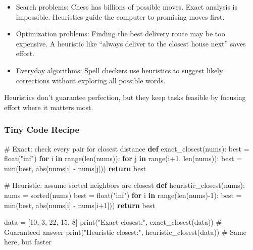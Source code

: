 \documentclass[
  letterpaper,
  DIV=11,
  numbers=noendperiod]{scrreprt}
\newenvironment{Shaded}{\begin{snugshade}}{\end{snugshade}}
\newcommand{\BuiltInTok}[1]{\textcolor[rgb]{0.00,0.23,0.31}{#1}}
\newcommand{\CommentTok}[1]{\textcolor[rgb]{0.37,0.37,0.37}{#1}}
\newcommand{\ControlFlowTok}[1]{\textcolor[rgb]{0.00,0.23,0.31}{\textbf{#1}}}
\newcommand{\DecValTok}[1]{\textcolor[rgb]{0.68,0.00,0.00}{#1}}
\newcommand{\KeywordTok}[1]{\textcolor[rgb]{0.00,0.23,0.31}{\textbf{#1}}}
\newcommand{\NormalTok}[1]{\textcolor[rgb]{0.00,0.23,0.31}{#1}}
\newcommand{\OperatorTok}[1]{\textcolor[rgb]{0.37,0.37,0.37}{#1}}
\newcommand{\StringTok}[1]{\textcolor[rgb]{0.13,0.47,0.30}{#1}}
\providecommand{\tightlist}{%
  \setlength{\itemsep}{0pt}\setlength{\parskip}{0pt}}
\begin{document}
\begin{itemize}
\tightlist
\item
  Search problems: Chess has billions of possible moves. Exact analysis
  is impossible. Heuristics guide the computer to promising moves first.
\item
  Optimization problems: Finding the best delivery route may be too
  expensive. A heuristic like ``always deliver to the closest house
  next'' saves effort.
\item
  Everyday algorithms: Spell checkers use heuristics to suggest likely
  corrections without exploring all possible words.
\end{itemize}

Heuristics don't guarantee perfection, but they keep tasks feasible by
focusing effort where it matters most.

\subsubsection{Tiny Code Recipe}\label{tiny-code-recipe-81}

\begin{Shaded}
\begin{Highlighting}[]
\CommentTok{\# Exact: check every pair for closest distance}
\KeywordTok{def}\NormalTok{ exact\_closest(nums):}
\NormalTok{    best }\OperatorTok{=} \BuiltInTok{float}\NormalTok{(}\StringTok{"inf"}\NormalTok{)}
    \ControlFlowTok{for}\NormalTok{ i }\KeywordTok{in} \BuiltInTok{range}\NormalTok{(}\BuiltInTok{len}\NormalTok{(nums)):}
        \ControlFlowTok{for}\NormalTok{ j }\KeywordTok{in} \BuiltInTok{range}\NormalTok{(i}\OperatorTok{+}\DecValTok{1}\NormalTok{, }\BuiltInTok{len}\NormalTok{(nums)):}
\NormalTok{            best }\OperatorTok{=} \BuiltInTok{min}\NormalTok{(best, }\BuiltInTok{abs}\NormalTok{(nums[i] }\OperatorTok{{-}}\NormalTok{ nums[j]))}
    \ControlFlowTok{return}\NormalTok{ best}

\CommentTok{\# Heuristic: assume sorted neighbors are closest}
\KeywordTok{def}\NormalTok{ heuristic\_closest(nums):}
\NormalTok{    nums }\OperatorTok{=} \BuiltInTok{sorted}\NormalTok{(nums)}
\NormalTok{    best }\OperatorTok{=} \BuiltInTok{float}\NormalTok{(}\StringTok{"inf"}\NormalTok{)}
    \ControlFlowTok{for}\NormalTok{ i }\KeywordTok{in} \BuiltInTok{range}\NormalTok{(}\BuiltInTok{len}\NormalTok{(nums)}\OperatorTok{{-}}\DecValTok{1}\NormalTok{):}
\NormalTok{        best }\OperatorTok{=} \BuiltInTok{min}\NormalTok{(best, }\BuiltInTok{abs}\NormalTok{(nums[i] }\OperatorTok{{-}}\NormalTok{ nums[i}\OperatorTok{+}\DecValTok{1}\NormalTok{]))}
    \ControlFlowTok{return}\NormalTok{ best}

\NormalTok{data }\OperatorTok{=}\NormalTok{ [}\DecValTok{10}\NormalTok{, }\DecValTok{3}\NormalTok{, }\DecValTok{22}\NormalTok{, }\DecValTok{15}\NormalTok{, }\DecValTok{8}\NormalTok{]}
\BuiltInTok{print}\NormalTok{(}\StringTok{"Exact closest:"}\NormalTok{, exact\_closest(data))      }\CommentTok{\# Guaranteed answer}
\BuiltInTok{print}\NormalTok{(}\StringTok{"Heuristic closest:"}\NormalTok{, heuristic\_closest(data))  }\CommentTok{\# Same here, but faster}
\end{Highlighting}
\end{Shaded}
\end{document}
